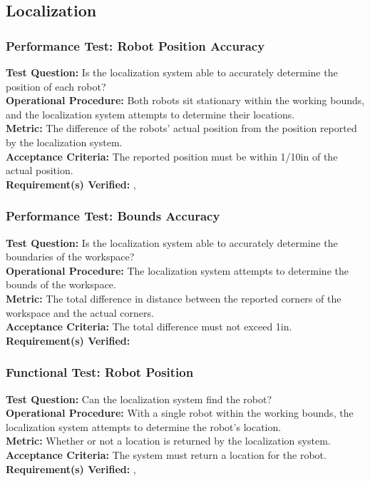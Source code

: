 
\subsection{Localization}
\label{sec:verification_localization}

\subsubsection{Performance Test: Robot Position Accuracy}
\label{sec:localization_pt_accuracy}
\textbf{Test Question:} Is the localization system able to accurately determine the position of each robot?\\
\textbf{Operational Procedure:} Both robots sit stationary within the working bounds, and the localization system attempts to determine their locations.\\
\textbf{Metric:} The difference of the robots' actual position from the position reported by the localization system. \\
\textbf{Acceptance Criteria:} The reported position must be within 1/10in of the actual position.\\
\textbf{Requirement(s) Verified:} , 

\subsubsection{Performance Test: Bounds Accuracy}
\label{sec:localization_pt_bounds}
\textbf{Test Question:} Is the localization system able to accurately determine the boundaries of the workspace?\\
\textbf{Operational Procedure:} The localization system attempts to determine the bounds of the workspace.\\
\textbf{Metric:} The total difference in distance between the reported corners of the workspace and the actual corners.\\
\textbf{Acceptance Criteria:} The total difference must not exceed 1in.\\
\textbf{Requirement(s) Verified:} 

\subsubsection{Functional Test: Robot Position}
\label{sec:localization_ft_robopos}
\textbf{Test Question:} Can the localization system find the robot?\\
\textbf{Operational Procedure:} With a single robot within the working bounds, the localization system attempts to determine the robot's location.\\
\textbf{Metric:} Whether or not a location is returned by the localization system.\\
\textbf{Acceptance Criteria:} The system must return a location for the robot. \\
\textbf{Requirement(s) Verified:} , 

